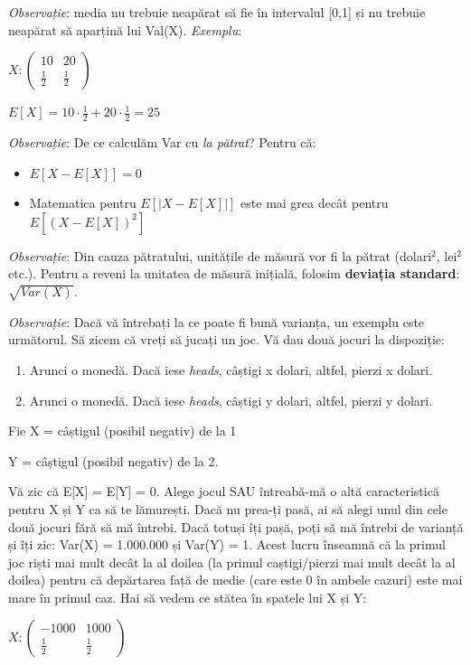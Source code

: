 \documentclass[12pt]{article}
\begin{document}
	\textit{Observație}: media nu trebuie neapărat să fie în intervalul [0,1] și nu trebuie neapărat să aparțină lui Val(X). \textit{Exemplu}:
	
	$X:\begin{pmatrix}
	10&20\\
	\frac{1}{2}&\frac{1}{2}
	\end{pmatrix}$
	
	$E[X] = 10 \cdot \frac{1}{2} + 20 \cdot \frac{1}{2} = 25$
	
	\textit{Observație}: De ce calculăm Var cu \textit{la pătrat}? Pentru că:
	\begin{itemize}
		\item $E[X - E[X]] = 0$
		\item Matematica pentru $E[|X - E[X]|]$ este mai grea decât pentru $E[(X - E[X])^2]$
	\end{itemize}
	
	\textit{Observație}: Din cauza pătratului, unitățile de măsură vor fi la pătrat (dolari$^2$, lei$^2$ etc.). Pentru a reveni la unitatea de măsură inițială, folosim \textbf{deviația standard}:
	$\sqrt{Var(X)}$.
	
	\textit{Observație}: Dacă vă întrebați la ce poate fi bună varianța, un exemplu este următorul. Să zicem că vreți să jucați un joc. Vă dau două jocuri la dispoziție:
	\begin{enumerate}
		\item Arunci o monedă. Dacă iese \textit{heads}, câștigi x dolari, altfel, pierzi x dolari.
		\item Arunci o monedă. Dacă iese \textit{heads}, câștigi y dolari, altfel, pierzi y dolari.
	\end{enumerate}
	Fie X = câștigul (posibil negativ) de la 1
	
	Y = câștigul (posibil negativ) de la 2.
	
	Vă zic că E[X] = E[Y] = 0. Alege jocul SAU întreabă-mă o altă caracteristică pentru X și Y ca să te lămurești. Dacă nu prea-ți pasă, ai să alegi unul din cele două jocuri fără să mă întrebi. Dacă totuși îți pașă, poți să mă întrebi de varianță și îți zic: Var(X) = 1.000.000 și Var(Y) = 1. Acest lucru înseamnă că la primul joc riști mai mult decât la al doilea (la primul caștigi/pierzi mai mult decât la al doilea) pentru că depărtarea față de medie (care este 0 în ambele cazuri) este mai mare în primul caz. Hai să vedem ce stătea în spatele lui X și Y:
	
	$X: \begin{pmatrix}
	-1000 & 1000\\
	\frac{1}{2} & \frac{1}{2}
	\end{pmatrix}$
	
\end{document}
